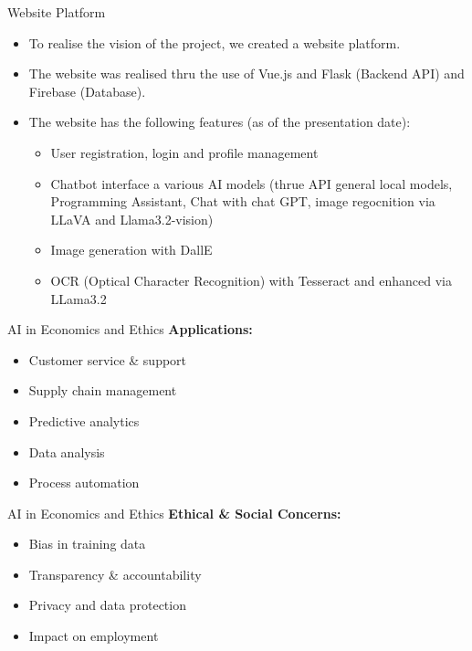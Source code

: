 \documentclass{beamer}
\begin{document}
\begin{frame}{Website Platform}
  \begin{itemize}
    \item To realise the vision of the project, we created a website platform. 
    \item The website was realised thru the use of Vue.js and Flask (Backend API) and Firebase (Database).
    \item The website has the following features (as of the presentation date):
    \begin{itemize}
      \item User registration, login and profile management
      \item Chatbot interface a various AI models (thrue API general local models, Programming Assistant, Chat with chat GPT, image regocnition via LLaVA and Llama3.2-vision)
      \item Image generation with DallE
      \item OCR (Optical Character Recognition) with Tesseract and enhanced via LLama3.2
    \end{itemize}
    \end{itemize}
\end{frame}

\begin{frame}{AI in Economics and Ethics}
\textbf{Applications:}
        \begin{itemize}
          \item Customer service \& support
          \item Supply chain management
          \item Predictive analytics
          \item Data analysis
          \item Process automation
        \end{itemize}

\end{frame}

\begin{frame}{AI in Economics and Ethics}
\textbf{Ethical \& Social Concerns:}
        \begin{itemize}
          \item Bias in training data
          \item Transparency \& accountability
          \item Privacy and data protection
          \item Impact on employment
        \end{itemize}
\end{frame}
\end{document}
